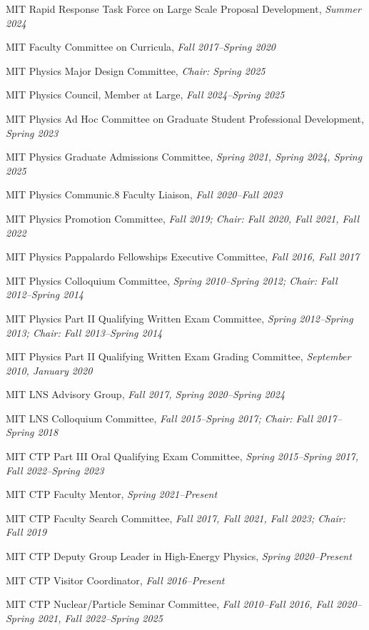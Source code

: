 \bbl
\item MIT Rapid Response Task Force on Large Scale Proposal Development, \emph{Summer 2024}
\item MIT Faculty Committee on Curricula, \emph{Fall 2017--Spring 2020}
\item MIT Physics Major Design Committee, \emph{Chair: Spring 2025}
\item MIT Physics Council, Member at Large, \emph{Fall 2024--Spring 2025}
\item MIT Physics Ad Hoc Committee on Graduate Student Professional Development, \emph{Spring 2023}
\item MIT Physics Graduate Admissions Committee, \emph{Spring 2021, Spring 2024, Spring 2025}
\item MIT Physics Communic.8 Faculty Liaison, \emph{Fall 2020--Fall 2023}
\item MIT Physics Promotion Committee, \emph{Fall 2019; Chair: Fall 2020, Fall 2021, Fall 2022}
\item MIT Physics Pappalardo Fellowships Executive Committee, \emph{Fall 2016, Fall 2017}
\item MIT Physics Colloquium Committee, \emph{Spring 2010--Spring 2012; Chair: Fall 2012--Spring 2014}
\item MIT Physics Part II Qualifying Written Exam Committee, \emph{Spring 2012--Spring 2013; Chair: Fall 2013--Spring 2014}
\item MIT Physics Part II Qualifying Written Exam Grading Committee, \emph{September 2010, January 2020}
\item MIT LNS Advisory Group, \emph{Fall 2017, Spring 2020--Spring 2024}
\item MIT LNS Colloquium Committee, \emph{Fall 2015--Spring 2017; Chair: Fall 2017--Spring 2018}
\item MIT CTP Part III Oral Qualifying Exam Committee, \emph{Spring 2015--Spring 2017, Fall 2022--Spring 2023}
\item MIT CTP Faculty Mentor, \emph{Spring 2021--Present}
\item MIT CTP Faculty Search Committee, \emph{Fall 2017, Fall 2021, Fall 2023; Chair: Fall 2019}
\item MIT CTP Deputy Group Leader in High-Energy Physics, \emph{Spring 2020--Present}
\item MIT CTP Visitor Coordinator, \emph{Fall 2016--Present}
\item MIT CTP Nuclear/Particle Seminar Committee, \emph{Fall 2010--Fall 2016, Fall 2020--Spring 2021, Fall 2022--Spring 2025}
